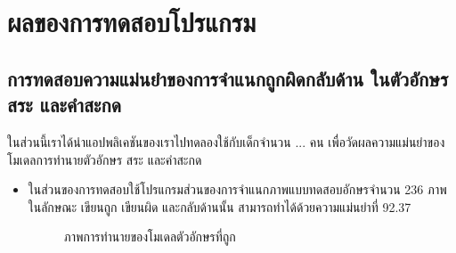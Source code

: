 \documentclass[12pt,oneside,openright,a4paper]{cpe-thai-project}
\begin{document}
\section{ผลของการทดสอบโปรแกรม}
\subsection{การทดสอบความแม่นยำของการจำแนกถูกผิดกลับด้าน ในตัวอักษร สระ และคำสะกด}
ในส่วนนี้เราได้นำแอปพลิเคชันของเราไปทดลองใช้กับเด็กจำนวน ... คน เพื่อวัดผลความแม่นยำของโมเดลการทำนายตัวอักษร สระ และคำสะกด 
\begin{itemize}
  \item ในส่วนของการทดสอบใช้โปรแกรมส่วนของการจำแนกภาพแบบทดสอบอักษรจำนวน 236 ภาพในลักษณะ เขียนถูก เขียนผิด และกลับด้านนั้น สามารถทำได้ด้วยความแม่นยำที่ 92.37%
  \begin{figure}[!h]\centering
    \setlength{\fboxrule}{0.2mm} %
    \setlength{\fboxsep}{1cm}
    \caption{ภาพการทำนายของโมเดลตัวอักษรที่ถูก}\label{fig:system}                  
   \end{figure}
   \newpage
   \begin{figure}[!h]\centering
    \setlength{\fboxrule}{0.2mm} %

\end{figure}
\end{itemize}
\end{document}
